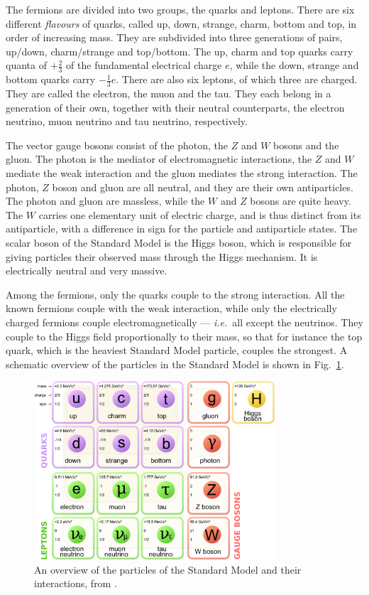 \documentclass[twoside,english]{uiofysmaster}
\begin{document}
The fermions are divided into two groups, the quarks and leptons. There are six different {\it flavours} of quarks, called up, down, strange, charm, bottom and top, in order of increasing mass. They are subdivided into three generations of pairs, up/down, charm/strange and top/bottom. The up, charm and top quarks carry quanta of $+\frac{2}{3}$ of the fundamental electrical charge $e$, while the down, strange and bottom quarks carry $-\frac{1}{3}e$. There are also six leptons, of which three are charged. They are called the electron, the muon and the tau. They each belong in a generation of their own, together with their neutral counterparts, the electron neutrino, muon neutrino and tau neutrino, respectively. 

The vector gauge bosons consist of the photon, the $Z$ and $W$ bosons and the gluon. The photon is the mediator of electromagnetic interactions, the $Z$ and $W$ mediate the weak interaction and the gluon mediates the strong interaction. The photon, $Z$ boson and gluon are all neutral, and they are their own antiparticles. The photon and gluon are massless, while the $W$ and $Z$ bosons are quite heavy. The $W$ carries one elementary unit of electric charge, and is thus distinct from its antiparticle, with a difference in sign for the particle and antiparticle states. The scalar boson of the Standard Model is the Higgs boson, which is responsible for giving particles their observed mass through the Higgs mechanism. It is electrically neutral and very massive.

Among the fermions, only the quarks couple to the strong interaction. All the known fermions couple with the weak interaction, while only the electrically charged fermions couple electromagnetically --- {\it i.e.}\ all except the neutrinos. They couple to the Higgs field proportionally to their mass, so that for instance the top quark, which is the heaviest Standard Model particle, couples the strongest. A schematic overview of the particles in the Standard Model is shown in Fig.\  \ref{fig:SM_particles}.
\begin{figure}[hbt]
	\centering
	\includegraphics[width=0.8\textwidth]{figures/susyintro/Standard_Model_of_Elementary_Particles.pdf}
	\caption{An overview of the particles of the Standard Model and their interactions, from \cite{Wikimedia_SM_particles}.}
	\label{fig:SM_particles}
\end{figure}
\end{document}
